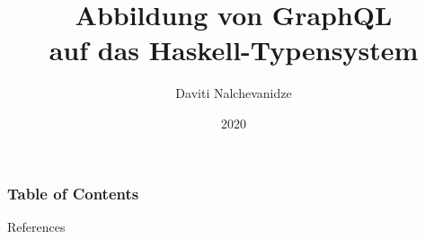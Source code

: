 \documentclass[aspectratio=169,t,xcolor=table]{beamer}
\begin{document}
\title[Inf UFG]{Abbildung von GraphQL \\ auf das Haskell-Typensystem}

\author{Daviti Nalchevanidze}

\date{2020}
\frame[noframenumbering]{\titlepage}



\begin{frame}
    \frametitle{Table of Contents}
    \tableofcontents
\end{frame}





\nocite{*}
\begin{frame}{References}
    \printbibliography
\end{frame}

\appendix


\titlepage
\end{document}
